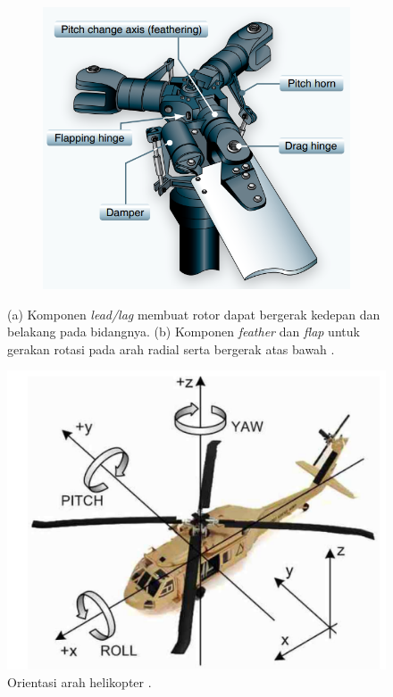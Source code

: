 \begin{figure}[H]
\begin{subfigure}{0.17\textwidth}
		\caption{}
		\label{fig:lead/lag}
	\end{subfigure}
	\centering
	\begin{subfigure}{0.4\textwidth}
		\centering
		\includegraphics[width=\linewidth]{gambar/feather_flap.png}
		\caption{}
		\label{fig:featherflap}
	\end{subfigure}
	\caption{(a) Komponen \textit{lead/lag} membuat rotor dapat bergerak kedepan dan belakang pada bidangnya. (b) Komponen \textit{feather} dan \textit{flap} untuk gerakan rotasi pada arah radial serta bergerak atas bawah \cite{handbook}.}
	\label{fig:fullyarticulated}
\end{figure}

\begin{figure}[H]
	\centering
	\includegraphics[width=0.5\linewidth]{gambar/roll-pitch-yaw.png}
	\caption{Orientasi arah helikopter \cite{Jhwang}.}
	\label{fig:orientasiheli}
\end{figure}

